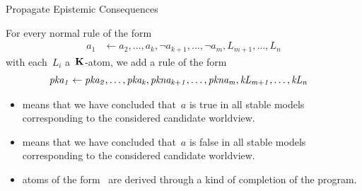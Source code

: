 \documentclass[aspectratio=169,svgnames,xcolor=table,t]{beamer}
\begin{document}
\begin{frame}{Propagate Epistemic Consequences}
    \begin{myitemize}
        \item[] For every normal rule of the form
        \begin{align}
            a_1 &\leftarrow 
            a_2,\!\dotsc\!,a_k,
            \neg a_{k+1},\!\dotsc\!,\neg a_m,
            {L_{m+1}},\!\dotsc\!,{L_n}
        \end{align}
        with each~$L_i$ a~$\mathbf{K}$-atom, we add a rule of the form
        \begin{gather}
            \begin{aligned}
                \kp{a_1} &\span\span\leftarrow 
                \kp{a_2},\dotsc,\kp{a_k},
                \kpnott{a_{k+1}},\dotsc,\kpnott{a_m},
                \kk{L_{m+1}},\dotsc,\kk{L_n}
            \end{aligned}
        \end{gather}
        \vspace*{-15pt}
        \begin{itemize}
            \item {} means that we have concluded that~$a$ is true in all stable models corresponding to the considered candidate worldview.
            \item {} means that we have concluded that~$a$ is false in all stable models corresponding to the considered candidate worldview.
            \item atoms of the form~ are derived through a kind of completion of the program.
        \end{itemize}
    \end{myitemize}
\end{frame}
\end{document}
